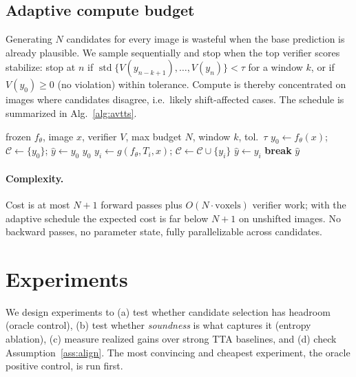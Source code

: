 \documentclass[10pt,twocolumn]{article}
\begin{document}
\subsection{Adaptive compute budget}
Generating $N$ candidates for every image is wasteful when the base prediction is already plausible. We sample sequentially and stop when the top verifier scores stabilize: stop at $n$ if $\operatorname{std}\{V(y_{n-k+1}),\dots,V(y_n)\}<\tau$ for a window $k$, or if $V(y_0)\ge 0$ (no violation) within tolerance. Compute is thereby concentrated on images where candidates disagree, i.e.\ likely shift-affected cases. The schedule is summarized in Alg.~\ref{alg:avtts}.

\begin{algorithm}[t]
\caption{AV-TTS (select-best with adaptive budget)}\label{alg:avtts}
\begin{algorithmic}[1]
\Require frozen $f_\theta$, image $x$, verifier $V$, max budget $N$, window $k$, tol.\ $\tau$
\State $y_0 \gets f_\theta(x)$; \quad $\mathcal{C}\gets\{y_0\}$; \quad $\hat y \gets y_0$
 \Return $y_0$  \EndIf
{}
  \State $y_i \gets g(f_\theta, T_i, x)$; \quad $\mathcal{C}\gets\mathcal{C}\cup\{y_i\}$
   $\hat y \gets y_i$ \EndIf
   \textbf{break} \EndIf
\EndFor
\State \Return $\hat y$ 
\end{algorithmic}
\end{algorithm}

\paragraph{Complexity.} Cost is at most $N{+}1$ forward passes plus $O(N\cdot\text{voxels})$ verifier work; with the adaptive schedule the expected cost is far below $N{+}1$ on unshifted images. No backward passes, no parameter state, fully parallelizable across candidates.

\section{Experiments}\label{sec:exp}
We design experiments to (a) test whether candidate selection has headroom (oracle control), (b) test whether \emph{soundness} is what captures it (entropy ablation), (c) measure realized gains over strong TTA baselines, and (d) check Assumption~\ref{ass:align}. The most convincing and cheapest experiment, the oracle positive control, is run first.
\end{document}
